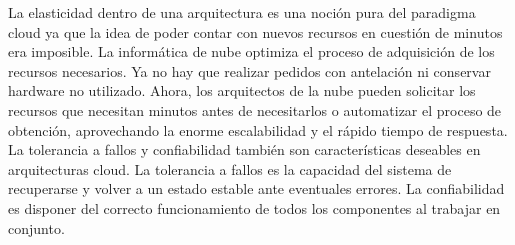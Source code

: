  La elasticidad dentro de una arquitectura es una noción pura del paradigma cloud ya que la idea de poder contar con nuevos recursos en cuestión de minutos era imposible. La informática de nube optimiza el proceso de adquisición de los recursos necesarios. Ya no hay que realizar pedidos con antelación ni conservar hardware no utilizado. Ahora, los arquitectos de 
la nube pueden solicitar los recursos que necesitan minutos antes de necesitarlos o automatizar el proceso de obtención, aprovechando la enorme escalabilidad y el rápido tiempo de respuesta. 
La tolerancia a fallos y confiabilidad también son características deseables en arquitecturas cloud. La tolerancia a fallos es la capacidad del sistema de recuperarse y volver a un estado estable ante eventuales errores. La confiabilidad es disponer del correcto funcionamiento de todos los componentes al trabajar en conjunto.